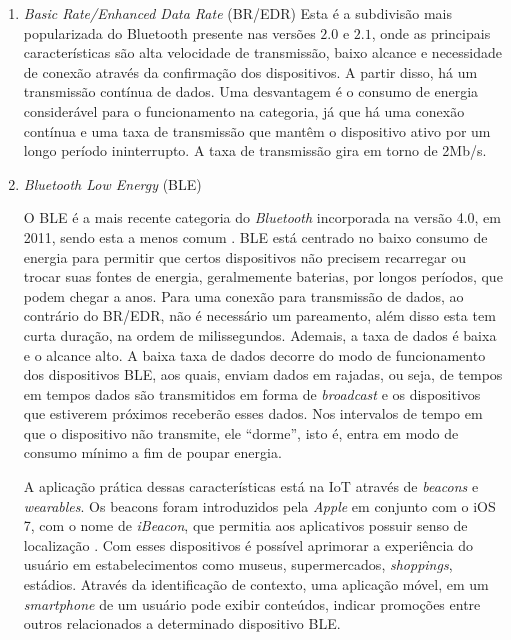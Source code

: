 \begin{enumerate}[label=(\Alph*)]
    
    \item \textit{Basic Rate/Enhanced Data Rate} (BR/EDR)
    Esta é a subdivisão mais popularizada do Bluetooth presente nas versões $2.0$ e $2.1$, onde as principais características são alta velocidade de transmissão, baixo alcance e necessidade de conexão através da confirmação dos dispositivos. A partir disso, há um transmissão contínua de dados. Uma desvantagem é o consumo de energia considerável para o funcionamento na categoria, já que há uma conexão contínua e uma taxa de transmissão que mantêm o dispositivo ativo por um longo período ininterrupto.
    A taxa de transmissão gira em torno de 2Mb/s.
     
    
    \item \textit{Bluetooth Low Energy} (BLE)
    
    O BLE é a mais recente categoria do \textit{Bluetooth} incorporada na versão 4.0, em 2011, sendo esta a menos comum \cite{LinkLabs2015}.
    BLE está centrado no baixo consumo de energia para permitir que certos dispositivos não precisem recarregar ou trocar suas fontes de energia, geralmemente baterias, por longos períodos, que podem chegar a anos. 
    Para uma conexão para transmissão de dados, ao contrário do BR/EDR, não é necessário um pareamento, além disso esta tem curta duração, na ordem de milissegundos.
    Ademais, a taxa de dados é baixa e o alcance alto. A baixa taxa de dados decorre do modo de funcionamento dos dispositivos BLE, aos quais, enviam dados em rajadas, ou seja, de tempos em tempos dados são transmitidos em forma de \textit{broadcast} e os dispositivos que estiverem próximos receberão esses dados. Nos intervalos de tempo em que o dispositivo não transmite, ele ``dorme'', isto é, entra em modo de consumo mínimo a fim de poupar energia.
    
    A aplicação prática dessas características está na IoT através de \textit{beacons} e \textit{wearables}. Os beacons foram introduzidos pela \textit{Apple}\textsuperscript{\textregistered} em conjunto com o iOS 7, com o nome de \textit{iBeacon}, que permitia aos aplicativos possuir senso de localização \cite{Apple2014}. Com esses dispositivos é possível aprimorar a experiência do usuário em estabelecimentos como museus, supermercados, \textit{shoppings}, estádios. Através da identificação de contexto, uma aplicação móvel, em um \textit{smartphone} de um usuário pode exibir conteúdos, indicar promoções entre outros relacionados a determinado dispositivo BLE.
    

\end{enumerate}
